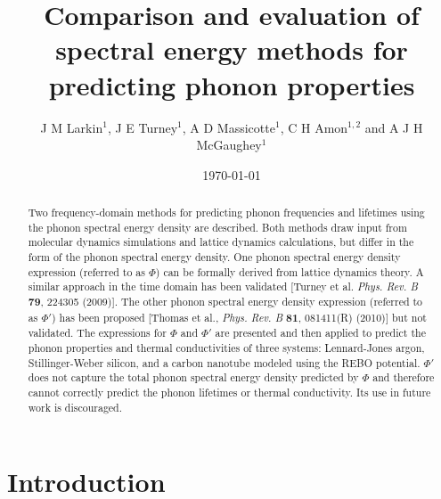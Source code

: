 \documentclass[12pt,twocolumn,iop]{/usr/share/texmf-texlive/tex/latex/iop/iopart}[/usr/share/texmf-texlive/tex/latex/iop/]
\begin{document}
\title{Comparison and evaluation of spectral energy methods for predicting phonon properties}

\author{J M Larkin$^1$, J E Turney$^1$,
A D Massicotte$^1$, C H Amon$^{1,2}$  and A J H McGaughey$^1$ }

\address{$^1$ Department of Mechanical Engineering\\Carnegie Mellon University\\Pittsburgh, PA 15213}
\address{$^2$ Department of Mechanical \& Industrial Engineering, University of Toronto, Toronto, Ontario, Canada M5S 3G8}


\date{\today}

\begin{abstract}
Two frequency-domain methods for predicting phonon frequencies and lifetimes
using the phonon spectral energy density are described. Both methods draw
input from molecular dynamics simulations and lattice dynamics calculations,
but differ in the form of the phonon spectral energy density.
One phonon spectral energy density expression (referred to as $\Phi$) can be
formally derived from lattice dynamics theory. A similar approach in the
time domain has been validated [Turney et al. \emph{Phys. Rev. B} \textbf{79}, 224305
(2009)]. The other phonon spectral energy density expression (referred to as
$\Phi'$) has been proposed [Thomas et al., \emph{Phys. Rev. B} \textbf{81}, 081411(R) (2010)]
but not validated. The expressions for $\Phi$ and $\Phi'$ are presented and then
applied to predict the phonon properties and thermal conductivities of three
systems: Lennard-Jones argon, Stillinger-Weber silicon, and a carbon
nanotube modeled using the REBO potential. $\Phi'$ does not capture the total
phonon spectral energy density predicted by $\Phi$ and therefore cannot
correctly predict the phonon lifetimes or thermal conductivity. Its use in
future work is discouraged.
\end{abstract}


\submitto{\JPCM}

\maketitle


\section{\label{Section_Introduction}Introduction}
\end{document}
